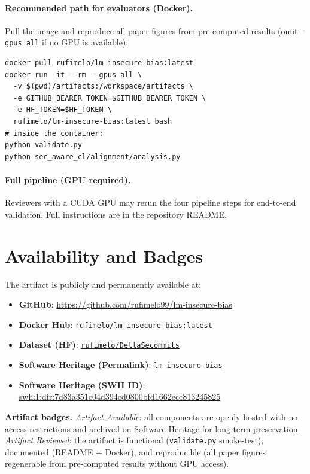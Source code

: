 \documentclass[conference]{IEEEtran}
\begin{document}
\paragraph{Recommended path for evaluators (Docker).}
Pull the image and reproduce all paper figures from pre-computed results
(omit \texttt{--gpus all} if no GPU is available):

{\small\begin{verbatim}
docker pull rufimelo/lm-insecure-bias:latest
docker run -it --rm --gpus all \
  -v $(pwd)/artifacts:/workspace/artifacts \
  -e GITHUB_BEARER_TOKEN=$GITHUB_BEARER_TOKEN \
  -e HF_TOKEN=$HF_TOKEN \
  rufimelo/lm-insecure-bias:latest bash
# inside the container:
python validate.py
python sec_aware_cl/alignment/analysis.py
\end{verbatim}}


\paragraph{Full pipeline (GPU required).}
Reviewers with a CUDA GPU may rerun the four pipeline steps for end-to-end
validation. Full instructions are in the repository README.

\vspace{0.5cm}
\section{Availability and Badges}

The artifact is publicly and permanently available at:

\begin{itemize}
  \item \textbf{GitHub}: {\footnotesize\url{https://github.com/rufimelo99/lm-insecure-bias}}
  \item \textbf{Docker Hub}: {\small\texttt{rufimelo/lm-insecure-bias:latest}}
  \item \textbf{Dataset (HF)}:
        \href{https://huggingface.co/datasets/rufimelo/DeltaSecommits}%
             {\texttt{rufimelo/DeltaSecommits}}
  \item \textbf{Software Heritage (Permalink)}:
        \href{https://archive.softwareheritage.org/swh:1:dir:7d83a351c04d394cd0800bfd1662ecc813245825;origin=https://github.com/rufimelo99/lm-insecure-bias;visit=swh:1:snp:c4cd318e8d1e3bbce65b7ffa9af54215c621b92b;anchor=swh:1:rev:f1c9ca390901276f2e42a397539f30e12ce2c549}%
             {\texttt{lm-insecure-bias}}
   \item \textbf{Software Heritage (SWH ID)}:
            \url{swh:1:dir:7d83a351c04d394cd0800bfd1662ecc813245825}
\end{itemize}

\noindent\textbf{Artifact badges.}
\emph{Artifact Available}: all components are openly hosted with no access
restrictions and archived on Software Heritage for long-term preservation.
\emph{Artifact Reviewed}: the artifact is functional (\texttt{validate.py}
smoke-test), documented (README + Docker), and reproducible (all paper figures
regenerable from pre-computed results without GPU access).

\balance
\end{document}
